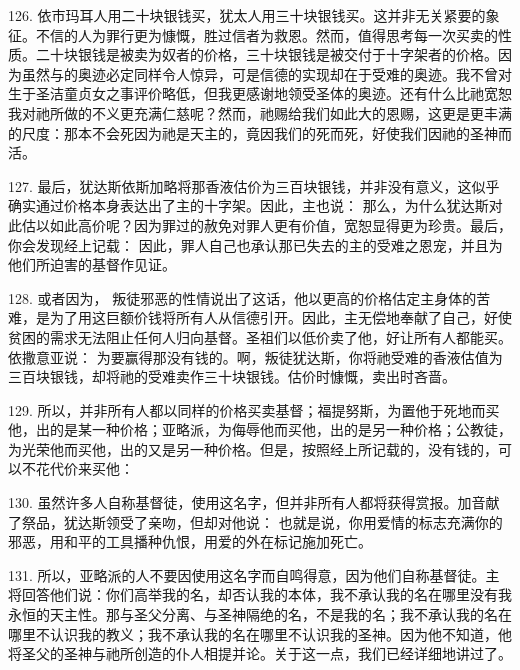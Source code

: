 126. 依市玛耳人用二十块银钱买，犹太人用三十块银钱买。这并非无关紧要的象征。不信的人为罪行更为慷慨，胜过信者为救恩。然而，值得思考每一次买卖的性质。二十块银钱是被卖为奴者的价格，三十块银钱是被交付于十字架者的价格。因为虽然与的奥迹必定同样令人惊异，可是信德的实现却在于受难的奥迹。我不曾对生于圣洁童贞女之事评价略低，但我更感谢地领受圣体的奥迹。还有什么比祂宽恕我对祂所做的不义更充满仁慈呢？然而，祂赐给我们如此大的恩赐，这更是更丰满的尺度：那本不会死因为祂是天主的，竟因我们的死而死，好使我们因祂的圣神而活。\par

127. 最后，犹达斯依斯加略将那香液估价为三百块银钱，并非没有意义，这似乎确实通过价格本身表达出了主的十字架。因此，主也说：  那么，为什么犹达斯对此估以如此高价呢？因为罪过的赦免对罪人更有价值，宽恕显得更为珍贵。最后，你会发现经上记载：  因此，罪人自己也承认那已失去的主的受难之恩宠，并且为他们所迫害的基督作见证。\par

128. 或者因为，  叛徒邪恶的性情说出了这话，他以更高的价格估定主身体的苦难，是为了用这巨额价钱将所有人从信德引开。因此，主无偿地奉献了自己，好使贫困的需求无法阻止任何人归向基督。圣祖们以低价卖了他，好让所有人都能买。依撒意亚说：  为要赢得那没有钱的。啊，叛徒犹达斯，你将祂受难的香液估值为三百块银钱，却将祂的受难卖作三十块银钱。估价时慷慨，卖出时吝啬。\par

129. 所以，并非所有人都以同样的价格买卖基督；福提努斯，为置他于死地而买他，出的是某一种价格；亚略派，为侮辱他而买他，出的是另一种价格；公教徒，为光荣他而买他，出的又是另一种价格。但是，按照经上所记载的，没有钱的，可以不花代价来买他： \par

130.   虽然许多人自称基督徒，使用这名字，但并非所有人都将获得赏报。加音献了祭品，犹达斯领受了亲吻，但却对他说：  也就是说，你用爱情的标志充满你的邪恶，用和平的工具播种仇恨，用爱的外在标记施加死亡。\par

131. 所以，亚略派的人不要因使用这名字而自鸣得意，因为他们自称基督徒。主将回答他们说：你们高举我的名，却否认我的本体，我不承认我的名在哪里没有我永恒的天主性。那与圣父分离、与圣神隔绝的名，不是我的名；我不承认我的名在哪里不认识我的教义；我不承认我的名在哪里不认识我的圣神。因为他不知道，他将圣父的圣神与祂所创造的仆人相提并论。关于这一点，我们已经详细地讲过了。\par

